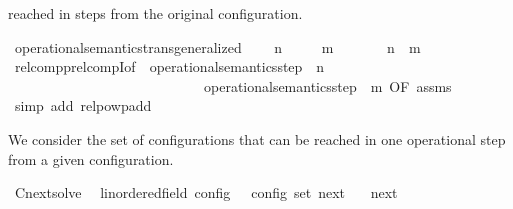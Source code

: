 \begin{isabellebody}
\begin{isamarkuptext}
  reached in  steps from the original configuration.%
\end{isamarkuptext}\isamarkuptrue%
\isamarkupfalse%
\ operational{\isacharunderscore}semantics{\isacharunderscore}trans{\isacharunderscore}generalized{\isacharcolon}\isanewline
\ \ \ {\isacartoucheopen}{\isasymC}\ {\isasymhookrightarrow}\isactrlbsup n\isactrlesup \ {\isasymC}\isanewline
\ \ \ {\isacartoucheopen}{\isasymC}\ {\isasymhookrightarrow}\isactrlbsup m\isactrlesup \ {\isasymC}\isanewline
\ \ \ \ \ {\isacartoucheopen}{\isasymC}\ {\isasymhookrightarrow}\isactrlbsup n\ {\isacharplus}\ m\isactrlesup \ {\isasymC}\isanewline
%
\isadelimproof
%
\endisadelimproof
%
\isatagproof
{}\isamarkupfalse%
\ relcompp{\isachardot}relcompI{\isacharbrackleft}of\ \ {\isacartoucheopen}operational{\isacharunderscore}semantics{\isacharunderscore}step\ {\isacharcircum}{\isacharcircum}\ n{\isacartoucheclose}\ {\isacharunderscore}\ {\isacharunderscore}\ \isanewline
\ \ \ \ \ \ \ \ \ \ \ \ \ \ \ \ \ \ \ \ \ \ \ \ \ \ \ \ {\isacartoucheopen}operational{\isacharunderscore}semantics{\isacharunderscore}step\ {\isacharcircum}{\isacharcircum}\ m{\isacartoucheclose}{\isacharcomma}\ OF\ assms{\isacharbrackright}\isanewline
{}\isamarkupfalse%
\ {\isacharparenleft}simp\ add{\isacharcolon}\ relpowp{\isacharunderscore}add{\isacharparenright}%
\endisatagproof
{\isafoldproof}%
%
\isadelimproof
%
\endisadelimproof
%
\begin{isamarkuptext}%
We consider the set of configurations that can be reached in one operational
  step from a given configuration.%
\end{isamarkuptext}\isamarkuptrue%
\isamarkupfalse%
\ Cnext{\isacharunderscore}solve\isanewline
\ \ {\isacharcolon}{\isacharcolon}{\isacartoucheopen}{\isacharparenleft}{\isacharprime}{\isasymtau}{\isacharcolon}{\isacharcolon}linordered{\isacharunderscore}field{\isacharparenright}\ config\ {\isasymRightarrow}\ {\isacharprime}{\isasymtau}\ config\ set{\isacartoucheclose}\ {\isacharparenleft}{\isachardoublequoteopen}{\isasymC}\isactrlsub n\isactrlsub e\isactrlsub x\isactrlsub t\ {\isacharunderscore}{\isachardoublequoteclose}{\isacharparenright}\isanewline
{}\isanewline
\ \ {\isacartoucheopen}{\isasymC}\isactrlsub n\isactrlsub e\isactrlsub x\isactrlsub t\ {\isasymS}\ {\isasymequiv}\ {\isacharbraceleft}\ {\isasymS}{\isacharprime}{\isachardot}\ {\isasymS}\ {\isasymhookrightarrow}\ {\isasymS}{\isacharprime}\ {\isacharbraceright}{\isacartoucheclose}%

\end{isabellebody}
